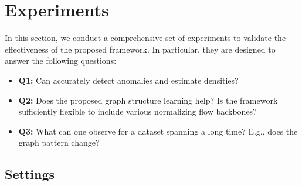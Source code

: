 \section{Experiments}
In this section, we conduct a comprehensive set of experiments to validate the effectiveness of the proposed {\method} framework. In particular, they are designed to answer the following questions:
\vspace{-0.2em}
\begin{itemize}[leftmargin=*]
  \item \textbf{Q1:} Can {\method} accurately detect anomalies and estimate densities?
  \item \textbf{Q2:} Does the proposed graph structure learning help? Is the framework sufficiently flexible to include various normalizing flow backbones?
  \item \textbf{Q3:} What can one observe for a dataset spanning a long time? E.g., does the graph pattern change?
\end{itemize}


\subsection{Settings}
\label{sec:exp_set}

